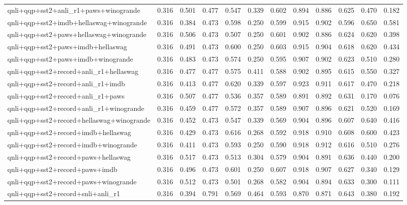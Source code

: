 \begin{table}[t]
\begin{tabular}{lrrrrrrrrrrr}
    qnli+qqp+sst2+anli\_r1+paws+winogrande & 0.316 & 0.501 & 0.477 & 0.547 & 0.339 & 0.602 & 0.894 & 0.886 & 0.625 & 0.470 & 0.182 \\
    qnli+qqp+sst2+imdb+hellaswag+winogrande & 0.316 & 0.384 & 0.473 & 0.598 & 0.250 & 0.599 & 0.915 & 0.902 & 0.596 & 0.650 & 0.581 \\
    qnli+qqp+sst2+paws+hellaswag+winogrande & 0.316 & 0.506 & 0.473 & 0.507 & 0.250 & 0.601 & 0.902 & 0.886 & 0.624 & 0.620 & 0.398 \\
    qnli+qqp+sst2+paws+imdb+hellaswag & 0.316 & 0.491 & 0.473 & 0.600 & 0.250 & 0.603 & 0.915 & 0.904 & 0.618 & 0.620 & 0.434 \\
    qnli+qqp+sst2+paws+imdb+winogrande & 0.316 & 0.483 & 0.473 & 0.574 & 0.250 & 0.595 & 0.907 & 0.902 & 0.623 & 0.510 & 0.280 \\
    qnli+qqp+sst2+record+anli\_r1+hellaswag & 0.316 & 0.477 & 0.477 & 0.575 & 0.411 & 0.588 & 0.902 & 0.895 & 0.615 & 0.550 & 0.327 \\
    qnli+qqp+sst2+record+anli\_r1+imdb & 0.316 & 0.413 & 0.477 & 0.620 & 0.339 & 0.597 & 0.923 & 0.911 & 0.617 & 0.470 & 0.218 \\
    qnli+qqp+sst2+record+anli\_r1+paws & 0.316 & 0.507 & 0.477 & 0.536 & 0.357 & 0.589 & 0.891 & 0.892 & 0.631 & 0.170 & 0.076 \\
    qnli+qqp+sst2+record+anli\_r1+winogrande & 0.316 & 0.459 & 0.477 & 0.572 & 0.357 & 0.589 & 0.907 & 0.896 & 0.621 & 0.520 & 0.169 \\
    qnli+qqp+sst2+record+hellaswag+winogrande & 0.316 & 0.452 & 0.473 & 0.547 & 0.339 & 0.569 & 0.904 & 0.896 & 0.607 & 0.640 & 0.416 \\
    qnli+qqp+sst2+record+imdb+hellaswag & 0.316 & 0.429 & 0.473 & 0.616 & 0.268 & 0.592 & 0.918 & 0.910 & 0.608 & 0.600 & 0.423 \\
    qnli+qqp+sst2+record+imdb+winogrande & 0.316 & 0.411 & 0.473 & 0.593 & 0.250 & 0.590 & 0.918 & 0.912 & 0.616 & 0.510 & 0.276 \\
    qnli+qqp+sst2+record+paws+hellaswag & 0.316 & 0.517 & 0.473 & 0.513 & 0.304 & 0.579 & 0.904 & 0.891 & 0.636 & 0.440 & 0.200 \\
    qnli+qqp+sst2+record+paws+imdb & 0.316 & 0.496 & 0.473 & 0.601 & 0.250 & 0.607 & 0.918 & 0.907 & 0.627 & 0.340 & 0.129 \\
    qnli+qqp+sst2+record+paws+winogrande & 0.316 & 0.512 & 0.473 & 0.501 & 0.268 & 0.582 & 0.904 & 0.894 & 0.633 & 0.300 & 0.111 \\
    qnli+qqp+sst2+record+snli+anli\_r1 & 0.316 & 0.394 & 0.791 & 0.569 & 0.464 & 0.593 & 0.870 & 0.871 & 0.643 & 0.380 & 0.192 \\

\end{tabular}
\end{table}

